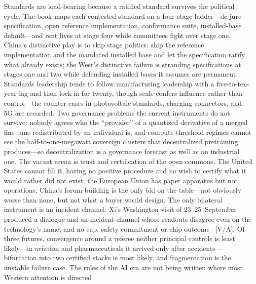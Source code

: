 Standards are load-bearing because a ratified standard survives the political cycle. The book maps each contested standard on a four-stage ladder---de jure specification, open reference implementation, conformance suite, installed-base default---and rent lives at stage four while committees fight over stage one. China's distinctive play is to skip stage politics: ship the reference implementation and the mandated installed base and let the specification ratify what already exists; the West's distinctive failure is stranding specifications at stages one and two while defending installed bases it assumes are permanent. Standards leadership tends to follow manufacturing leadership with a five-to-ten-year lag and then lock in for twenty, though scale confers influence rather than control---the counter-cases in photovoltaic standards, charging connectors, and 5G are recorded. Two governance problems the current instruments do not survive: nobody agrees who the ``provider'' of a quantized derivative of a merged fine-tune redistributed by an individual is, and compute-threshold regimes cannot see the half-to-one-megawatt sovereign clusters that decentralized pretraining produces---so decentralization is a governance forecast as well as an industrial one. The vacant arena is trust and certification of the open commons. The United States cannot fill it, having no positive procedure and no wish to certify what it would rather did not exist; the European Union has paper apparatus but not operations; China's forum-building is the only bid on the table---not obviously worse than none, but not what a buyer would design. The only bilateral instrument is an incident channel: Xi's Washington visit of 23--25~September produced a dialogue and an incident channel whose readouts disagree even on the technology's name, and no cap, safety commitment or chip outcome~\cite{gov-wh-xi-factsheet,gov-mfa-deliverables,gov-summit-readings} [V/A]. Of three futures, convergence around a referee neither principal controls is least likely---in aviation and pharmaceuticals it arrived only after accidents---bifurcation into two certified stacks is most likely, and fragmentation is the unstable failure case. The rules of the AI era are not being written where most Western attention is directed .


